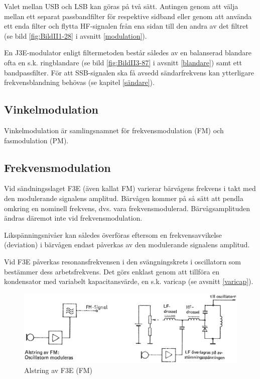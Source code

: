 Valet mellan USB och LSB kan göras på två sätt.
Antingen genom att välja mellan ett separat passbandfilter för respektive
sidband eller genom att använda ett enda filter och flytta HF-signalen från ena
sidan till den andra av det filtret (se bild \ref{fig:BildII1-28} i
avsnitt \ref{modulation}).

En J3E-modulator enligt filtermetoden består således av en balanserad
blandare ofta en s.k. ringblandare (se bild \ref{fig:BildII3-87} i avsnitt
\ref{blandare}) samt ett bandpassfilter.
För att SSB-signalen ska få avsedd sändarfrekvens kan ytterligare
frekvensblandning behövas (se kapitel \ref{sändare}).

\subsection{Vinkelmodulation}

Vinkelmodulation är samlingsnamnet för frekvensmodulation (FM) och
fasmodulation (PM).

\subsection{Frekvensmodulation}

Vid sändningsslaget F3E (även kallat FM) varierar bärvågens frekvens i
takt med den modulerande signalens amplitud.
Bärvågen kommer på så sätt att pendla omkring en nominell frekvens, dvs. vara
frekvensmodulerad.
Bärvågsamplituden ändras däremot inte vid frekvensmodulation.

Likspänningsnivåer kan således överföras eftersom en frekvensavvikelse
(deviation) i bärvågen endast påverkas av den modulerande signalens amplitud.

Vid F3E påverkas resonansfrekvensen i den svängningskrets i oscillatorn som
bestämmer dess arbetsfrekvens.
Det görs enklast genom att tillföra en kondensator med variabelt
kapacitansvärde, en s.k. varicap (se avsnitt \ref{varicap}).

\begin{figure}
\includegraphics[width=\textwidth]{images/cropped_pdfs/bild_2_3-91.pdf}
\caption{Alstring av F3E (FM)}
\label{fig:BildII3-91}
\end{figure}

